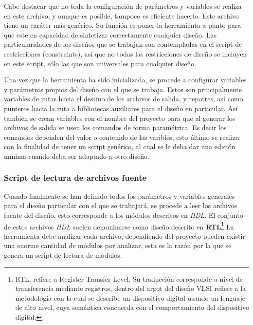 Cabe destacar que no toda la configuración de parámetros y variables se realiza en este archivo, y aunque es posible, tampoco es eficiente hacerlo. Este archivo tiene un caráter más genérico. Su función es poner la herramienta a punto para que este en capacidad de sintetizar correctamente cualquier diseño. Las particularidades de los diseños que se trabajan son contempladas en el script de restricciones (constraints), así que no todas las restricciones de diseño se incluyen en este script, sólo las que son universales para cualquier diseño. 

Una vez que la herramienta ha sido inicializada, se procede a configurar variables y parámetros propios del diseño con el que se trabaja. Estos son principalmente variables de rutas hacia el destino de los archivos de salida, y reportes, así como punteros hacia la ruta a bibliotecas auxiliares para el diseño en particular. Así también se crean variables con el nombre del proyecto para que al generar los archivos de salida se usen los comandos de forma paramétrica. Es decir los comandos dependen del valor o contenido de las varibles, esto último se realiza con la finalidad de tener un script genérico, al cual se le deba dar una edición mínima cuando deba ser adaptado a otro diseño.

\subsubsection{Script de lectura de archivos fuente}

Cuando finalmente se han definido todos los parámetros y variables generales para el diseño particular con el que se trabajará, se procede a leer los archivos fuente del diseño, esto corresponde a los módulos descritos en \textit{HDL}. El conjunto de estos archivos \textit{HDL} suelen denominarse como diseño descrito en \textbf{RTL}\footnote{RTL, refiere a Register Transfer Level. Su traducción corresponde a nivel de transferencia mediante registros, dentro del argot del diseño VLSI refiere a la metodología con la cual se describe un dispositivo digital usando un lenguaje de alto nivel, cuya semántica concuerda con el comportamiento del dispositivo digital.} La herramienta debe analizar cada archivo, dependiendo del proyecto pueden existir una enorme cantidad de módulos por analizar, esta es la razón por la que se genera un script de lectura de módulos.

